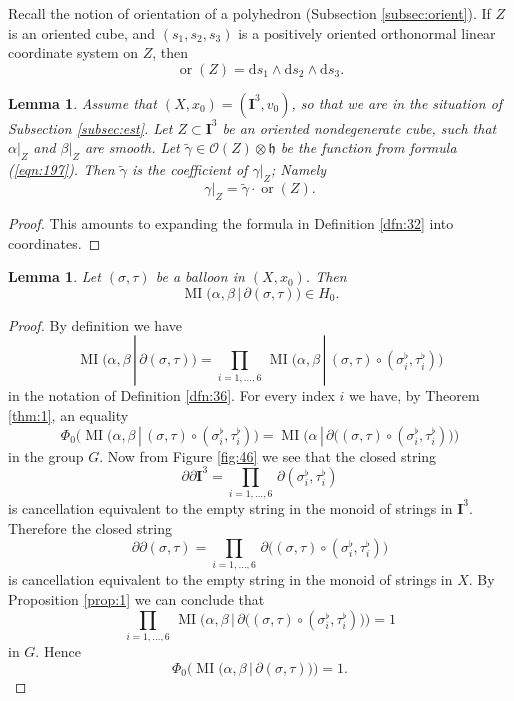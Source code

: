 \documentclass[10pt, a4paper]{amsart}
\newtheorem{lem}[equation]{Lemma}
\theoremstyle{definition}
\numberwithin{equation}{section}
\newcommand{\opn}{\operatorname}
\newcommand{\mfrak}[1]{\mathfrak{#1}}
\newcommand{\mcal}[1]{\mathcal{#1}}
\newcommand{\mbf}[1]{\mathbf{#1}}
\newcommand{\mrm}[1]{\mathrm{#1}}
\newcommand{\tup}[1]{\textup{#1}}
\newcommand{\til}[1]{\tilde{#1}}
\renewcommand{\vert}{\, | \,}
\newcommand{\h}{\mfrak{h}}
\renewcommand{\d}{\mrm{d}}
\begin{document}
Recall the notion of orientation of a polyhedron (Subsection
\ref{subsec:orient}). If $Z$ is an oriented cube, and 
$(s_1, s_2, s_3)$ is a positively oriented orthonormal linear coordinate system
on $Z$, then 
\[ \opn{or}(Z) = \d s_1 \wedge \d s_2 \wedge \d s_3 . \] 

\begin{lem} \label{lem:48}
Assume that $(X, x_0) = (\mbf{I}^3, v_0)$, so that we are in the situation of
Subsection \tup{\ref{subsec:est}}. 
Let $Z \subset \mbf{I}^3$ be an oriented nondegenerate cube, such that 
$\alpha|_Z$ and $\beta|_Z$ are smooth. Let
$\til{\gamma} \in \mcal{O}(Z) \otimes \h$ be the function from formula
\tup{(\ref{eqn:197})}. Then $\til{\gamma}$ is the coefficient of $\gamma|_Z$;
Namely
\[ \gamma|_Z = \til{\gamma} \cdot \opn{or}(Z) . \]
\end{lem}

\begin{proof}
This amounts to expanding the formula in Definition \ref{dfn:32} into
coordinates.
\end{proof}

\begin{lem} \label{lem:39}
Let $(\sigma, \tau)$ be a balloon in $(X, x_0)$. Then
\[ \opn{MI} \bigl(\alpha, \beta \vert \partial (\sigma, \tau) \bigr) 
\in H_0 . \]
\end{lem}

\begin{proof}
By definition we have
\[ \opn{MI} \bigl(\alpha, \beta \vert \partial (\sigma, \tau) \bigr) = 
\prod_{i = 1, \ldots, 6} \,
\opn{MI} \bigl(\alpha, \beta \vert (\sigma, \tau) \circ 
(\sigma^{\flat}_i, \tau^{\flat}_i) \bigr)  \]
in the notation of Definition \ref{dfn:36}.
For every index $i$ we have, by Theorem \ref{thm:1}, an equality
\[ \Phi_0 \bigl( \opn{MI} \bigl(\alpha, \beta \vert (\sigma, \tau) \circ 
(\sigma^{\flat}_i, \tau^{\flat}_i) \bigr) =
\opn{MI} \bigl(\alpha \vert \partial \bigl(
(\sigma, \tau) \circ (\sigma^{\flat}_i, \tau^{\flat}_i) \bigr) \bigr)  \]
in the group $G$. 
Now from Figure \ref{fig:46} we see that the closed string
\[ \partial \partial \mbf{I}^3 =
\prod_{i = 1, \ldots, 6} \, \partial (\sigma^{\flat}_i, \tau^{\flat}_i) \]
is cancellation equivalent to the empty string in the monoid of strings
in $\mbf{I}^3$. Therefore the closed string
\[ \partial \partial (\sigma, \tau) = 
\prod_{i = 1, \ldots, 6} \, \partial \bigl(
(\sigma, \tau) \circ (\sigma^{\flat}_i, \tau^{\flat}_i) \bigr) \]
is cancellation equivalent to the empty string in the monoid of strings in 
$X$. By Proposition \ref{prop:1} we can conclude that 
\[ \prod_{i = 1, \ldots, 6} \,
\opn{MI} \bigl(\alpha, \beta \vert \partial \bigl(
(\sigma, \tau) \circ (\sigma^{\flat}_i, \tau^{\flat}_i) \bigr) \bigr) = 1 \]
in $G$. Hence
\[ \Phi_0 \bigl( 
\opn{MI} \bigl(\alpha, \beta \vert \partial (\sigma, \tau) \bigr)
\bigr) = 1 . \]
\end{proof}
\end{document}
